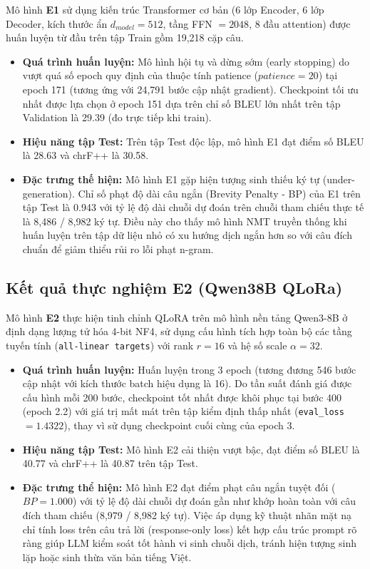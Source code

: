 Mô hình \textbf{E1} sử dụng kiến trúc Transformer cơ bản (6 lớp Encoder, 6 lớp Decoder, kích thước ẩn $d_{model} = 512$, tầng FFN $= 2048$, 8 đầu attention) được huấn luyện từ đầu trên tập Train gồm 19,218 cặp câu.
\begin{itemize}
    \item \textbf{Quá trình huấn luyện:} Mô hình hội tụ và dừng sớm (early stopping) do vượt quá số epoch quy định của thuộc tính patience ($patience = 20$) tại epoch 171 (tương ứng với 24,791 bước cập nhật gradient). Checkpoint tối ưu nhất được lựa chọn ở epoch 151 dựa trên chỉ số BLEU lớn nhất trên tập Validation là 29.39 (đo trực tiếp khi train).
    \item \textbf{Hiệu năng tập Test:} Trên tập Test độc lập, mô hình E1 đạt điểm số BLEU là 28.63 và chrF++ là 30.58.
    \item \textbf{Đặc trưng thế hiện:} Mô hình E1 gặp hiện tượng sinh thiếu ký tự (under-generation). Chỉ số phạt độ dài câu ngắn (Brevity Penalty - BP) của E1 trên tập Test là 0.943 với tỷ lệ độ dài chuỗi dự đoán trên chuỗi tham chiếu thực tế là 8,486 / 8,982 ký tự. Điều này cho thấy mô hình NMT truyền thống khi huấn luyện trên tập dữ liệu nhỏ có xu hướng dịch ngắn hơn so với câu đích chuẩn để giảm thiểu rủi ro lỗi phạt n-gram.
\end{itemize}

\subsection{Kết quả thực nghiệm E2 (Qwen38B QLoRa)}

Mô hình \textbf{E2} thực hiện tinh chỉnh QLoRA trên mô hình nền tảng Qwen3-8B ở định dạng lượng tử hóa 4-bit NF4, sử dụng cấu hình tích hợp toàn bộ các tầng tuyến tính (\texttt{all-linear targets}) với rank $r = 16$ và hệ số scale $\alpha = 32$.
\begin{itemize}
    \item \textbf{Quá trình huấn luyện:} Huấn luyện trong 3 epoch (tương đương 546 bước cập nhật với kích thước batch hiệu dụng là 16). Do tần suất đánh giá được cấu hình mỗi 200 bước, checkpoint tốt nhất được khôi phục tại bước 400 (epoch 2.2) với giá trị mất mát trên tập kiểm định thấp nhất (\texttt{eval\_loss} $= 1.4322$), thay vì sử dụng checkpoint cuối cùng của epoch 3.
    \item \textbf{Hiệu năng tập Test:} Mô hình E2 cải thiện vượt bậc, đạt điểm số BLEU là 40.77 và chrF++ là 40.87 trên tập Test.
    \item \textbf{Đặc trưng thể hiện:} Mô hình E2 đạt điểm phạt câu ngắn tuyệt đối ($BP = 1.000$) với tỷ lệ độ dài chuỗi dự đoán gần như khớp hoàn toàn với câu đích tham chiếu (8,979 / 8,982 ký tự). Việc áp dụng kỹ thuật nhãn mặt nạ chỉ tính loss trên câu trả lời (response-only loss) kết hợp cấu trúc prompt rõ ràng giúp LLM kiểm soát tốt hành vi sinh chuỗi dịch, tránh hiện tượng sinh lặp hoặc sinh thừa văn bản tiếng Việt.
\end{itemize}

